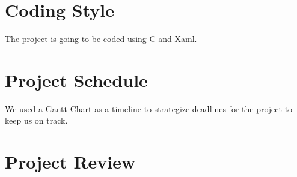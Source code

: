 \documentclass{article}
\begin{document}
\section{Coding Style}
The project is going to be coded using \href{https://users.ece.cmu.edu/~eno/coding/CCodingStandard.html}{C} and \href{https://github.com/cmaneu/xaml-coding-guidelines/blob/master/README.mdl}{Xaml}.

\section{Project Schedule}
We used a \href{run:../../ProjectSchedule/Team 12 Gantt Chart.gan}{Gantt Chart} as a timeline to strategize deadlines for the project to keep us on track. 

\section{Project Review}
\end{document}

